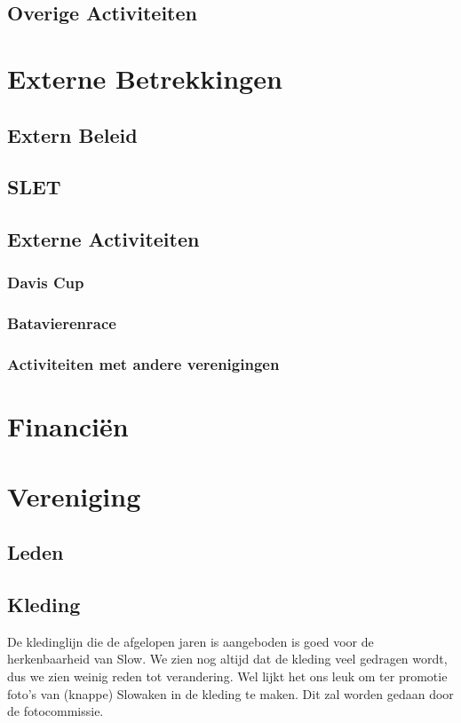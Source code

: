 \documentclass[]{article}
\begin{document}
\subsection{Overige Activiteiten}

\section{Externe Betrekkingen}
\subsection{Extern Beleid}

\subsection{SLET}

\subsection{Externe Activiteiten}
\subsubsection{Davis Cup}

\subsubsection{Batavierenrace}

\subsubsection{Activiteiten met andere verenigingen}
\section{Financi\"en}


\section{Vereniging}
\subsection{Leden}

\subsection{Kleding}
De kledinglijn die de afgelopen jaren is aangeboden is goed voor de herkenbaarheid van Slow. We zien nog altijd dat de kleding veel gedragen wordt, dus we zien weinig reden tot verandering. Wel lijkt het ons leuk om ter promotie foto's van (knappe) Slowaken in de kleding te maken. Dit zal worden gedaan door de fotocommissie.
\end{document}
